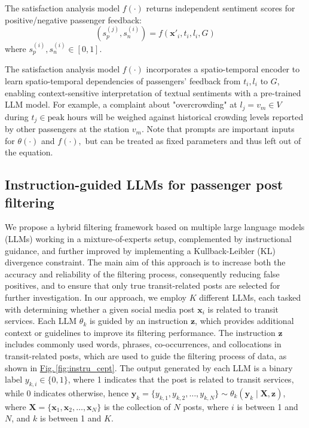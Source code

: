 \documentclass[a4paper,fleqn,12pt]{cas-sc}
\begin{document}
The satisfaction analysis model $f(\cdot)$ returns independent sentiment scores for positive/negative passenger feedback:
\begin{equation}
(s^{(j)}_{p}, s^{(i)}_{n}) = f(\boldsymbol{x}'_{i}, t_{i}, l_{i}, G)
\end{equation}
where $s^{(i)}_{p}, s^{(i)}_{n} \in [0,1]$. 

The satisfaction analysis model $f(\cdot)$ incorporates a spatio-temporal encoder to learn spatio-temporal dependencies of passengers' feedback from $t_{i}, l_{i}$ to $G$, enabling context-sensitive interpretation of textual sentiments with a pre-trained LLM model. For example, a complaint about "overcrowding" at $l_{j} = v_{m} \in V$ during $t_{j} \in \text{peak hours}$ will be weighed against historical crowding levels reported by other passengers at the station $v_{m}$. Note that prompts are important inputs for \( \theta(\cdot)\) and \(f(\cdot),\) but can be treated as fixed parameters and thus left out of the equation.

\subsection{Instruction-guided LLMs for passenger post filtering}\label{sec:filtering} 
We propose a hybrid filtering framework based on multiple large language models (LLMs) working in a mixture-of-experts setup, complemented by instructional guidance, and further improved by implementing a Kullback-Leibler (KL) divergence constraint. The main aim of this approach is to increase both the accuracy and reliability of the filtering process, consequently reducing false positives, and to ensure that only true transit-related posts are selected for further investigation. In our approach, we employ \( K \) different LLMs, each tasked with determining whether a given social media post \(\boldsymbol{x}_i\) is related to transit services. Each LLM \(\theta_k\) is guided by an instruction \(\boldsymbol{z}\), which provides additional context or guidelines to improve its filtering performance. The instruction \(\boldsymbol{z}\) includes commonly used words, phrases, co-occurrences, and collocations in transit-related posts, which are used to guide the filtering process of data, as shown in \hyperref[fig:instru_cept]{Fig.\,\ref{fig:instru_cept}}. The output generated by each LLM is a binary label \( y_{k,i } \in \{0,1\} \), where 1 indicates that the post is related to transit services, while 0 indicates otherwise, hence \(\boldsymbol{y}_k = \{y_{k,1}, y_{k,2}, \ldots, y_{k,N}\} \sim \theta_k(\boldsymbol{y}_k \mid \boldsymbol{X}, \boldsymbol{z})\), where \(\boldsymbol{X} = \{\boldsymbol{x}_1, \boldsymbol{x}_2, \ldots, \boldsymbol{x}_N\}\) is the collection of \(N\) posts, where \(i\) is between 1 and \(N\), and \(k\) is between 1 and \(K\).
\end{document}
